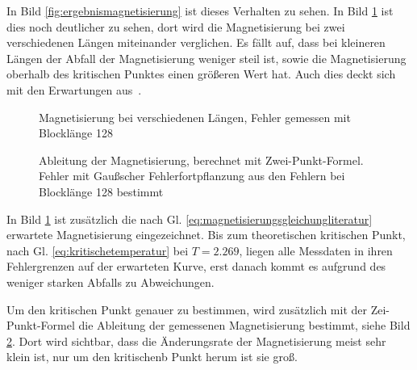 	In Bild \ref{fig:ergebnismagnetisierung} ist dieses Verhalten zu sehen. In Bild \ref{fig:maglaenge} ist dies noch deutlicher zu sehen, dort wird die Magnetisierung bei zwei verschiedenen Längen miteinander verglichen. Es fällt auf, dass bei kleineren Längen der Abfall der Magnetisierung weniger steil ist, sowie die Magnetisierung oberhalb des kritischen Punktes einen größeren Wert hat. Auch dies deckt sich mit den Erwartungen aus~\cite[Abschnitt 2.3.3]{binderheermann}.%
	
	
	\begin{figure}[htbp]
		
		\caption[Magnetisierung bei verschiedenen Längen]{Magnetisierung bei verschiedenen Längen, Fehler gemessen mit Blocklänge 128}
		\label{fig:maglaenge}
	\end{figure}

	\begin{figure}[htbp]
		
		\caption[Ableitung der Magnetisierung]{Ableitung der Magnetisierung, berechnet mit Zwei-Punkt-Formel. Fehler mit Gaußscher Fehlerfortpflanzung aus den Fehlern bei Blocklänge 128 bestimmt}
		\label{fig:ableitung120128}
	\end{figure}
	
	In Bild \ref{fig:maglaenge} ist zusätzlich die nach Gl. \ref{eq:magnetisierungsgleichungliteratur} erwartete Magnetisierung eingezeichnet. Bis zum theoretischen kritischen Punkt, nach Gl. \ref{eq:kritischetemperatur} bei $T=\num{2,269}$, liegen alle Messdaten in ihren Fehlergrenzen auf der erwarteten Kurve, erst danach kommt es aufgrund des weniger starken Abfalls zu Abweichungen.
	
	Um den kritischen Punkt genauer zu bestimmen, wird zusätzlich mit der Zei-Punkt-Formel die Ableitung der gemessenen Magnetisierung bestimmt, siehe Bild \ref{fig:ableitung120128}. Dort wird sichtbar, dass die Änderungsrate der Magnetisierung meist sehr klein ist, nur um den kritischenb Punkt herum ist sie groß.%
	
%		
%	
